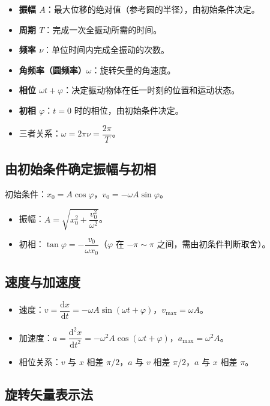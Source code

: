 \documentclass[12pt,a4paper]{ctexart}
\begin{document}
\begin{itemize}
    \item \textbf{振幅 $A$}：最大位移的绝对值（参考圆的半径），由初始条件决定。
    \item \textbf{周期 $T$}：完成一次全振动所需的时间。
    \item \textbf{频率 $\nu$}：单位时间内完成全振动的次数。
    \item \textbf{角频率（圆频率）$\omega$}：旋转矢量的角速度。
    \item \textbf{相位 $\omega t+\varphi$}：决定振动物体在任一时刻的位置和运动状态。
    \item \textbf{初相 $\varphi$}：$t=0$ 时的相位，由初始条件决定。
    \item 三者关系：$\omega=2\pi\nu=\dfrac{2\pi}{T}$。
\end{itemize}

\subsection{由初始条件确定振幅与初相}

初始条件：$x_0=A\cos\varphi$，$v_0=-\omega A\sin\varphi$。

\begin{itemize}
    \item 振幅：$A=\sqrt{x_0^2+\dfrac{v_0^2}{\omega^2}}$。
    \item 初相：$\tan\varphi=-\dfrac{v_0}{\omega x_0}$（$\varphi$ 在 $-\pi\sim\pi$ 之间，需由初条件判断取舍）。
\end{itemize}

\subsection{速度与加速度}

\begin{itemize}
    \item 速度：$v=\dfrac{\mathrm{d}x}{\mathrm{d}t}=-\omega A\sin(\omega t+\varphi)$，$v_{\max}=\omega A$。
    \item 加速度：$a=\dfrac{\mathrm{d}^2x}{\mathrm{d}t^2}=-\omega^2 A\cos(\omega t+\varphi)$，$a_{\max}=\omega^2 A$。
    \item 相位关系：$v$ 与 $x$ 相差 $\pi/2$，$a$ 与 $v$ 相差 $\pi/2$，$a$ 与 $x$ 相差 $\pi$。
\end{itemize}

\subsection{旋转矢量表示法}
\end{document}
